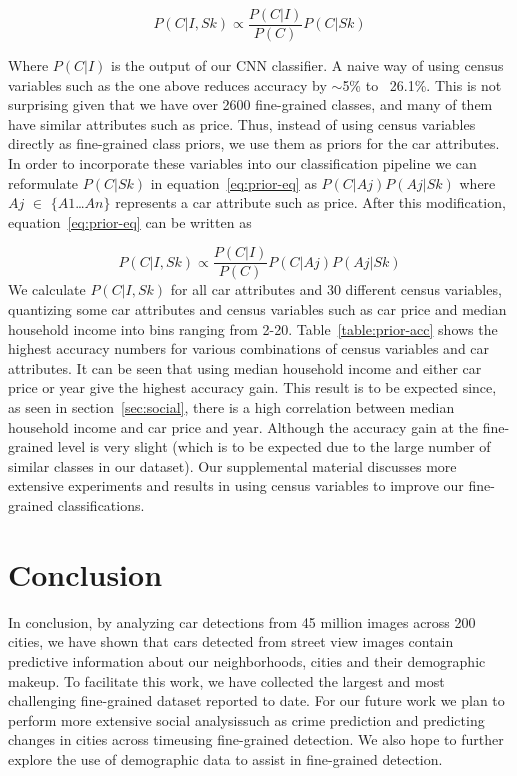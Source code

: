\documentclass[10pt,twocolumn,letterpaper]{article}
\begin{document}
\begin{equation}
P(C|I,Sk)\propto \frac{P(C|I)}{P(C)}P(C|Sk)
\label{eq:prior-eq}
\end{equation}

Where \(P(C|I)\) is the output of our CNN classifier. A naive way of using census variables such as the one above reduces accuracy by \(\sim\)5\% to ~26.1\%. This is not surprising given that we have over 2600 fine-grained classes, and many of them have similar attributes such as price. Thus, instead of using census variables directly as fine-grained class priors, we use them as priors for the car attributes. In order to incorporate these variables into our classification pipeline we can reformulate \(P(C|Sk)\) in equation~\ref{eq:prior-eq} as \(P(C|Aj)\)\(P(Aj|Sk)\) where \(Aj\) \(\in\) \(\{\)\(A1\)\ldots\(An\)\(\}\) represents a car attribute such as price. After this modification, equation~\ref{eq:prior-eq} can be written as  

\begin{equation}
  P(C|I,Sk) \propto \frac{P(C|I)}{P(C)}P(C|Aj)P(Aj|Sk)
\end{equation}
We calculate \(P(C|I,Sk)\) for all car attributes and 30 different census variables, quantizing some car attributes and census variables such as car price and median household income into bins ranging from 2-20. Table~\ref{table:prior-acc} shows the highest accuracy numbers for various combinations of census variables and car attributes. It can be seen that using median household income and either car price or year give the highest accuracy gain. This result is to be expected since, as seen in section~\ref{sec:social}, there is a high correlation between median household income and car price and year. Although the accuracy gain at the fine-grained level is very slight (which is to be expected due to the large number of similar classes in our dataset). Our supplemental material discusses more extensive experiments and results in using census variables to improve our fine-grained classifications.

\section{Conclusion}
In conclusion, by analyzing car detections from 45 million images across 200 cities, we have shown that cars detected from street view images contain predictive information about our neighborhoods, cities and their demographic makeup. To facilitate this work, we have collected the largest and most challenging fine-grained dataset reported to date. For our future work we plan to perform more extensive social analysis\textemdash such as crime prediction and predicting changes in cities across time\textemdash using fine-grained detection. We also hope to further explore the use of demographic data to assist in fine-grained detection. 
{\small


}
\end{document}
